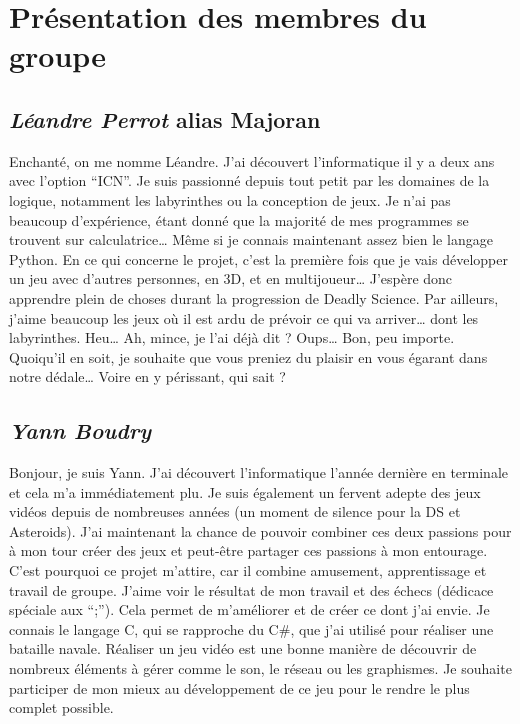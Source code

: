 \documentclass{article}
\begin{document}
\newpage
\section{Présentation des membres du groupe }

\subsection{\emph{Léandre Perrot} alias Majoran}
Enchanté, on me nomme Léandre. J’ai découvert l’informatique il y a deux ans avec l’option “ICN”. Je suis passionné depuis tout petit par les domaines de la logique, notamment les labyrinthes ou la conception de jeux. Je n’ai pas beaucoup d’expérience, étant donné que la majorité de mes programmes se trouvent sur calculatrice… Même si je connais maintenant assez bien le langage Python. En ce qui concerne le projet, c’est la première fois que je vais développer un jeu avec d’autres personnes, en 3D, et en multijoueur… J'espère donc apprendre plein de choses durant la progression de Deadly Science. Par ailleurs, j’aime beaucoup les jeux où il est ardu de prévoir ce qui va arriver… dont les labyrinthes. Heu… Ah, mince, je l’ai déjà dit ? Oups… Bon, peu importe. Quoiqu’il en soit, je souhaite que vous preniez du plaisir en vous égarant dans notre dédale… Voire en y périssant, qui sait ?

\subsection{\emph{Yann Boudry}}
Bonjour, je suis Yann. J’ai découvert l’informatique l’année dernière en terminale et cela m’a immédiatement plu. Je suis également un fervent adepte des jeux vidéos depuis de nombreuses années (un moment de silence pour la DS et Asteroids). J’ai maintenant la chance de pouvoir combiner ces deux passions pour à mon tour créer des jeux et peut-être partager ces passions à mon entourage. C’est pourquoi ce projet m’attire, car il combine amusement, apprentissage et travail de groupe. J’aime voir le résultat de mon travail et des échecs (dédicace spéciale aux “;”). Cela permet de m’améliorer et de créer ce dont j’ai envie. Je connais le langage C, qui se rapproche du C\#, que j’ai utilisé pour réaliser une bataille navale. Réaliser un jeu vidéo est une bonne manière de découvrir de nombreux éléments à gérer comme le son, le réseau ou les graphismes. Je souhaite participer de mon mieux au développement de ce jeu pour le rendre le plus complet possible.
\end{document}
